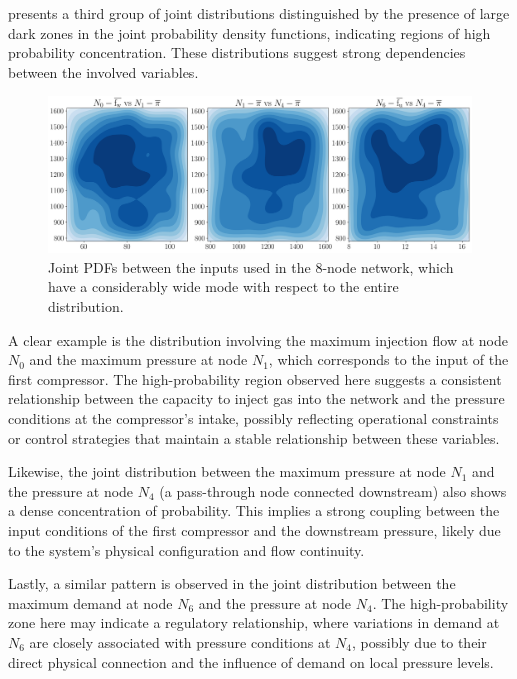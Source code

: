  presents a third group of joint distributions distinguished by the presence of large dark zones in the joint probability density functions, indicating regions of high probability concentration. These distributions suggest strong dependencies between the involved variables. 

\begin{figure}[htbp]
    \centering
    \includegraphics[width=.8\textwidth]{figures/Chapter_NonLinealCensnet/PDF_inputs_inputs_wide_mode.png}
    \caption{Joint PDFs between the inputs used in the 8-node network, which have a considerably wide mode with respect to the entire distribution.}
    \label{fig:joint_distributions_input_input_wide_mode}
\end{figure}


A clear example is the distribution involving the maximum injection flow at node $N_0$ and the maximum pressure at node $N_1$, which corresponds to the input of the first compressor. The high-probability region observed here suggests a consistent relationship between the capacity to inject gas into the network and the pressure conditions at the compressor’s intake, possibly reflecting operational constraints or control strategies that maintain a stable relationship between these variables.

Likewise, the joint distribution between the maximum pressure at node $N_1$ and the pressure at node $N_4$ (a pass-through node connected downstream) also shows a dense concentration of probability. This implies a strong coupling between the input conditions of the first compressor and the downstream pressure, likely due to the system’s physical configuration and flow continuity.

Lastly, a similar pattern is observed in the joint distribution between the maximum demand at node $N_6$ and the pressure at node $N_4$. The high-probability zone here may indicate a regulatory relationship, where variations in demand at $N_6$ are closely associated with pressure conditions at $N_4$, possibly due to their direct physical connection and the influence of demand on local pressure levels.
 



